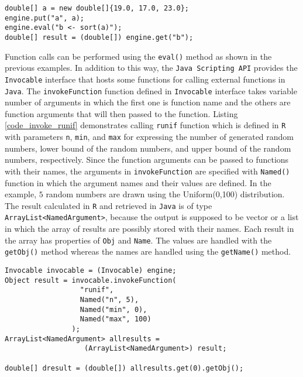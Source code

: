 \documentclass[10pt,a4paper, final, oneside]{article}
\begin{document}
\begin{minipage}{\linewidth}
\begin{lstlisting}[caption=Passing Java Arrays,label=code_r_script_array]
double[] a = new double[]{19.0, 17.0, 23.0};
engine.put("a", a);
engine.eval("b <- sort(a)");        
double[] result = (double[]) engine.get("b");
\end{lstlisting}
\end{minipage}

Function calls can be performed using the \texttt{eval()} method as shown in the previous examples. In addition to this way, the \texttt{Java Scripting API} provides the \texttt{Invocable} interface that hosts some functions for calling external functions in \texttt{Java}. The \texttt{invokeFunction} function defined in \texttt{Invocable} interface takes variable number of arguments in which the first one is function name and the others are function arguments that will then passed to the function. Listing \ref{code_invoke_runif} demonstrates calling \texttt{runif} function which is defined in \texttt{R} with parameters \texttt{n}, \texttt{min}, and \texttt{max} for expressing the number of generated random numbers, lower bound of the random numbers, and upper bound of the random numbers, respectively. Since the function arguments can be passed to functions with their names, the arguments in \texttt{invokeFunction} are specified with \texttt{Named()} function in which the argument names and their values are defined. In the example, $5$ random numbers are drawn using the Uniform(0,100) distribution. The result calculated in \texttt{R} and retrieved in \texttt{Java} is of type \texttt{ArrayList<NamedArgument>}, because the output is supposed to be vector or a list in which the array of results are possibly stored with their names. Each result in the array has properties of \texttt{Obj} and \texttt{Name}. The values are handled with the \texttt{getObj()} method whereas the names are handled using the \texttt{getName()} method.


\begin{minipage}{\linewidth}
\begin{lstlisting}[caption=Invoking runif,label=code_invoke_runif]
Invocable invocable = (Invocable) engine;
Object result = invocable.invokeFunction(
                  "runif",
                  Named("n", 5),
                  Named("min", 0),
                  Named("max", 100)
                );
ArrayList<NamedArgument> allresults = 
                   (ArrayList<NamedArgument>) result;

double[] dresult = (double[]) allresults.get(0).getObj();
\end{lstlisting}
\end{minipage}
\end{document}
